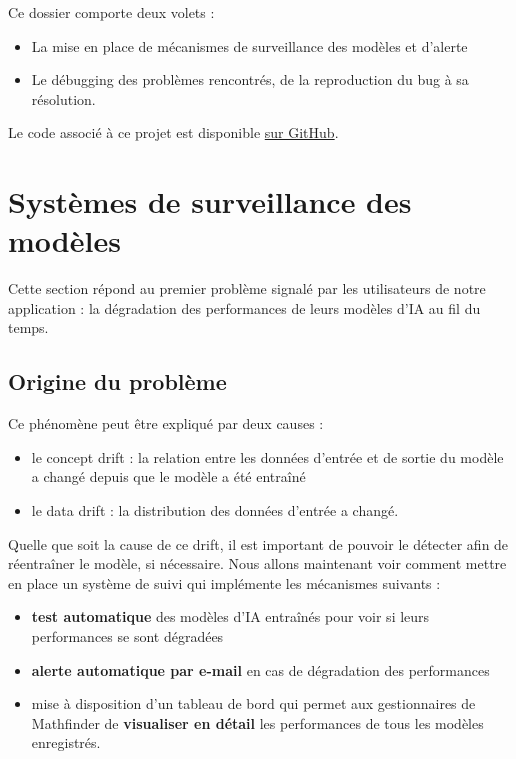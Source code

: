 \documentclass[french]{article}
\begin{document}
    Ce dossier comporte deux volets :
    \begin{itemize}
        \item La mise en place de mécanismes de surveillance des modèles et d'alerte
        \item Le débugging des problèmes rencontrés, de la reproduction du bug à sa résolution.
    \end{itemize}
    Le code associé à ce projet est disponible \href{https://github.com/vinpap/mathfinder}{sur GitHub}.


    \section{Systèmes de surveillance des modèles}
    Cette section répond au premier problème signalé par les utilisateurs de notre application : la dégradation des performances de leurs modèles d'IA au fil du temps.
    \subsection{Origine du problème}
    Ce phénomène peut être expliqué par deux causes :
    \begin{itemize}
        \item le concept drift : la relation entre les données d'entrée et de sortie du modèle a changé depuis que le modèle a été entraîné
        \item le data drift : la distribution des données d'entrée a changé.
    \end{itemize}
    Quelle que soit la cause de ce drift, il est important de pouvoir le détecter afin de réentraîner le modèle, si nécessaire. Nous allons maintenant voir comment mettre en place un système de suivi qui implémente les mécanismes suivants :
    \begin{itemize}
        \item \textbf{test automatique} des modèles d'IA entraînés pour voir si leurs performances se sont dégradées
        \item \textbf{alerte automatique par e-mail} en cas de dégradation des performances
        \item mise à disposition d'un tableau de bord qui permet aux gestionnaires de Mathfinder de \textbf{visualiser en détail} les performances de tous les modèles enregistrés.
    \end{itemize}
\end{document}
